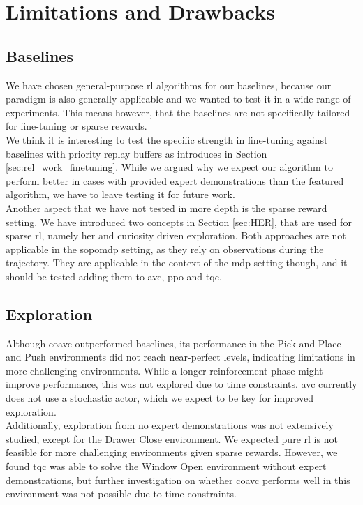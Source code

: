 \section{Limitations and Drawbacks}
\subsection{Baselines}
We have chosen general-purpose \ac{rl} algorithms for our baselines, because our paradigm is also generally applicable 
and we wanted to test it in a wide range of experiments. This means however, that the baselines are not specifically tailored for fine-tuning or sparse rewards.\\ 

We think it is interesting to test the specific strength in fine-tuning against baselines with priority replay buffers as introduces in Section \ref{sec:rel_work_finetuning}. 
While we argued why we expect our algorithm to perform better in cases with provided expert demonstrations than the featured algorithm, we have to 
leave testing it for future work.\\

Another aspect that we have not tested in more depth is the sparse reward setting. We have introduced two concepts in Section \ref{sec:HER}, that are used for sparse \ac{rl}, namely 
\ac{her} and curiosity driven exploration. Both approaches are not applicable in the \ac{sopomdp} setting, as they rely on observations during the trajectory. 
They are applicable in the context of the \ac{mdp} setting though, and it should be tested adding them to \ac{avc}, \ac{ppo} and \ac{tqc}.

\subsection{Exploration}
Although \ac{coavc} outperformed baselines, its performance in the Pick and Place and Push environments did not reach near-perfect levels, 
indicating limitations in more challenging environments. While a longer reinforcement phase might improve performance, this was not explored 
due to time constraints. \ac{avc} currently does not use a stochastic actor, which we expect to be key for improved exploration.\\ 

Additionally, exploration from no expert demonstrations was not extensively studied, except for the Drawer Close 
environment. We expected pure \ac{rl} is not feasible for more challenging environments given sparse rewards. 
However, we found \ac{tqc} was able to solve the Window Open environment without expert demonstrations, but further investigation on whether 
\ac{coavc} performs well in this environment was not possible due to time constraints.\\ 

